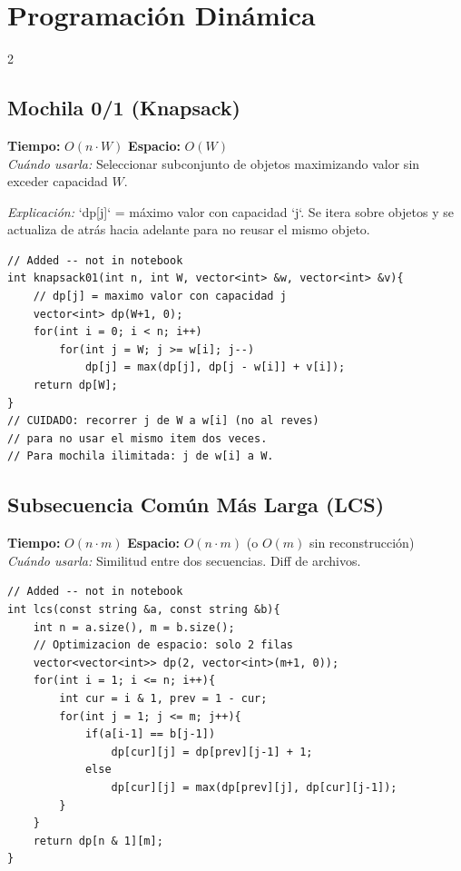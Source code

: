 \documentclass[10pt,a4paper]{article}
\begin{document}
\section{Programaci\'on Din\'amica}
\begin{multicols}{2}

\subsection{Mochila 0/1 (Knapsack)}
\textbf{Tiempo:} $O(n \cdot W)$ \quad \textbf{Espacio:} $O(W)$\\
\textit{Cu\'ando usarla:} Seleccionar subconjunto de objetos maximizando valor sin exceder capacidad $W$.

\textit{Explicación:} `dp[j]` = máximo valor con capacidad `j`. Se itera sobre objetos y se actualiza de atrás hacia adelante para no reusar el mismo objeto.

\begin{lstlisting}
// Added -- not in notebook
int knapsack01(int n, int W, vector<int> &w, vector<int> &v){
    // dp[j] = maximo valor con capacidad j
    vector<int> dp(W+1, 0);
    for(int i = 0; i < n; i++)
        for(int j = W; j >= w[i]; j--)
            dp[j] = max(dp[j], dp[j - w[i]] + v[i]);
    return dp[W];
}
// CUIDADO: recorrer j de W a w[i] (no al reves)
// para no usar el mismo item dos veces.
// Para mochila ilimitada: j de w[i] a W.
\end{lstlisting}

\subsection{Subsecuencia Com\'un M\'as Larga (LCS)}
\textbf{Tiempo:} $O(n \cdot m)$ \quad \textbf{Espacio:} $O(n \cdot m)$ (o $O(m)$ sin reconstrucci\'on)\\
\textit{Cu\'ando usarla:} Similitud entre dos secuencias. Diff de archivos.

\begin{lstlisting}
// Added -- not in notebook
int lcs(const string &a, const string &b){
    int n = a.size(), m = b.size();
    // Optimizacion de espacio: solo 2 filas
    vector<vector<int>> dp(2, vector<int>(m+1, 0));
    for(int i = 1; i <= n; i++){
        int cur = i & 1, prev = 1 - cur;
        for(int j = 1; j <= m; j++){
            if(a[i-1] == b[j-1])
                dp[cur][j] = dp[prev][j-1] + 1;
            else
                dp[cur][j] = max(dp[prev][j], dp[cur][j-1]);
        }
    }
    return dp[n & 1][m];
}


\end{lstlisting}
\end{multicols}
\end{document}
